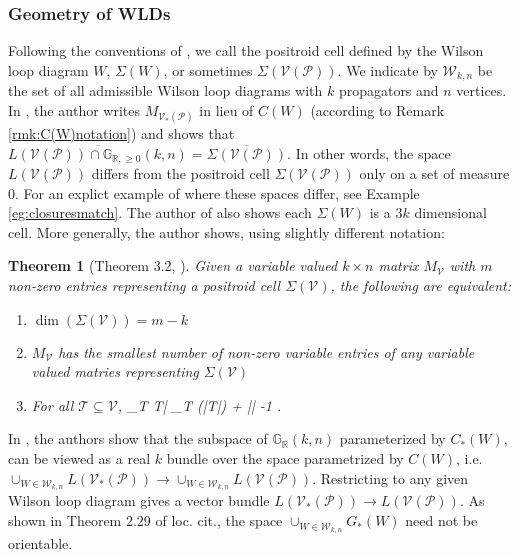\documentclass[11pt]{article}
\newcommand{\R}{\mathbb{R}}
\newcommand{\Gr}{\mathbb{G}_{\R, \geq 0}}
\newcommand{\Grall}{\mathbb{G}_{\R}}
\def\bas #1\eas{\begin{align*} #1 \end{align*}}
\newcommand{\cP}{\mathcal{P}}
\newcommand{\cV}{\mathcal{V}}
\newcommand{\VP}{\cV(\cP)}
\newcommand{\VPs}{\cV_*(\cP)}
\newcommand{\cW}{\mathcal{W}}
\newtheorem{thm}{Theorem}[section]
\theoremstyle{remark}
\theoremstyle{definition}
\begin{document}
\subsubsection{Geometry of WLDs \label{sec:geometry}}
Following the conventions of \cite{casestudy, generalcombinatorics1}, we call the positroid cell defined by the Wilson loop diagram $W$, $\Sigma(W)$, or sometimes $\Sigma(\VP)$. We indicate by $\cW_{k,n}$ be the set of all admissible Wilson loop diagrams with $k$ propagators and $n$ vertices. In \cite[Theorem 8.4]{basisshapeloci}, the author writes $M_{\VPs}$ in lieu of $C(W)$ (according to Remark \ref{rmk:C(W)notation}) and shows that $\overline{L(\VP) \cap \Gr(k,n)} = \overline{\Sigma(\VP)}$. In other words, the space $L(\VP)$ differs from the positroid cell $\Sigma(\VP)$ only on a set of measure 0. For an explict example of where these spaces differ, see Example \ref{eg:closuresmatch}. The author of \cite{basisshapeloci} also shows each $\Sigma(W)$ is a $3k$ dimensional cell. More generally, the author shows, using slightly different notation:

\begin{thm}[Theorem 3.2, \cite{basisshapeloci}]\label{res:minimalrep}
Given a variable valued $k \times n$ matrix $M_\cV$ with $m$ non-zero entries representing a positroid cell $\Sigma(\cV)$, the following are equivalent:
\begin{enumerate}
\item $\dim(\Sigma(\cV)) = m -k$ 
\item $M_\cV$ has the smallest number of non-zero variable entries of any variable valued matries representing $\Sigma(\cV)$
\item For all $\mathcal{T} \subseteq \cV$, \bas |\bigcup_{T \in {}}T| \geq \max_{T \in  {}} (|T|) + || -1 \;. \eas
\end{enumerate}
\end{thm}


In \cite[section 2.3]{non-orientable}, the authors show that  the subspace of $\Grall(k,n)$ parameterized by $C_*(W)$, can be viewed as a real $k$ bundle over the space parametrized by $C(W)$, i.e.  $\cup_{W \in \cW_{k,n}}L(\VPs) \rightarrow \cup_{W \in \cW_{k,n}}L(\VP)$. Restricting to any given Wilson loop diagram gives a vector bundle $L(\VPs) \rightarrow L(\VP)$. As shown in Theorem 2.29 of loc. cit., the space $\cup_{W \in \cW_{k,n}}G_*(W)$ need not be orientable. 
\end{document}
